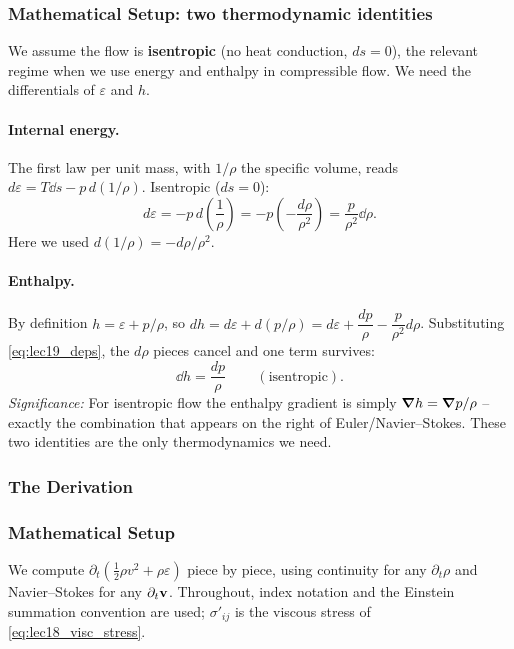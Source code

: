 \documentclass[../main.tex]{subfiles}
\begin{document}
\subsubsection*{Mathematical Setup: two thermodynamic identities}
We assume the flow is \textbf{isentropic} (no heat conduction, $ds=0$), the relevant regime when we use energy and enthalpy in compressible flow. We need the differentials of $\varepsilon$ and $h$.

\paragraph{Internal energy.} The first law per unit mass, with $1/\rho$ the specific volume, reads $d\varepsilon = T\dd{s} - p\,d(1/\rho)$. Isentropic ($ds=0$):
\begin{equation}
  d\varepsilon = -p\,d\!\left(\frac{1}{\rho}\right) = -p\left(-\frac{d\rho}{\rho^2}\right) = \frac{p}{\rho^2}\dd{\rho} .
  \label{eq:lec19_deps}
\end{equation}
Here we used $d(1/\rho)=-d\rho/\rho^2$.

\paragraph{Enthalpy.} By definition $h=\varepsilon+p/\rho$, so $dh=d\varepsilon+d(p/\rho)=d\varepsilon+\dfrac{dp}{\rho}-\dfrac{p}{\rho^2}d\rho$. Substituting \eqref{eq:lec19_deps}, the $d\rho$ pieces cancel and one term survives:
\begin{equation}
  \boxed{\dd{h}=\frac{dp}{\rho}\,}\qquad(\text{isentropic}).
  \label{eq:lec19_dh}
\end{equation}
\textit{Significance:} For isentropic flow the enthalpy gradient is simply $\grad h=\grad p/\rho$ -- exactly the combination that appears on the right of Euler/Navier--Stokes. These two identities are the only thermodynamics we need.

\subsubsection{The Derivation}\label{sec:lec19:dissipation_derivation}

\subsubsection*{Mathematical Setup}
We compute $\partial_t(\tfrac12\rho v^2+\rho\varepsilon)$ piece by piece, using continuity for any $\partial_t\rho$ and Navier--Stokes for any $\partial_t\mathbf{v}$. Throughout, index notation and the Einstein summation convention are used; $\sigma'_{ij}$ is the viscous stress of \eqref{eq:lec18_visc_stress}.
\end{document}
